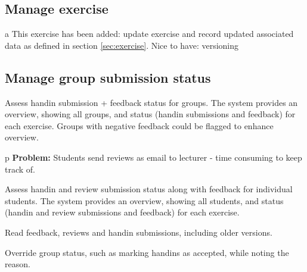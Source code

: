 \documentclass[Main]{subfiles}
\begin{document}
\subsection{Manage exercise} \label{sec:ManageExercise}

\begin{DataIntro}
\end{DataIntro}

\begin{TaskTable}
\RecordAddi
{a}
{This exercise has been added: update exercise and record updated associated data as defined in section \ref{sec:exercise}. }{Nice to have: versioning}{}

\end{TaskTable}





\subsection{Manage group submission status}\label{sec:ManageGroupSubmissions}

\begin{DataIntro}
\end{DataIntro}

\begin{TaskTable}
\Record
{Assess handin submission + feedback status for groups.}
{The system provides an overview, showing all groups, and status (handin submissions and feedback) for each exercise. 
Groups with negative feedback could be flagged to enhance overview.}{}

\RecordAddi
{p}
{\textbf{Problem:} Students send reviews as email to lecturer - time consuming to keep track of.}{}

\Record
{Assess handin and review submission status along with feedback for individual students.}
{The system provides an overview, showing all students, and status (handin and review submissions and feedback) for each exercise.}
{}

\Record
{Read feedback, reviews and handin submissions, including older versions.}
{}
{}

\Record
{Override group status, such as marking handins as accepted, while noting the reason.}
{}
{}
\end{TaskTable}
\end{document}

